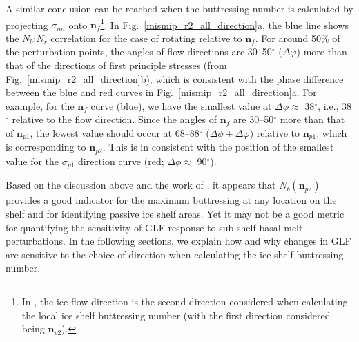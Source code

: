 \documentclass[tc, manuscript]{copernicus}
\begin{document}

A similar conclusion can be reached when the buttressing number is calculated by projecting $\sigma_{nn}$ onto $\mathbf{n}_{f}$\footnote{In \citet{furst2016}, the ice flow direction is the second direction considered when calculating the local ice shelf buttressing number (with the first direction considered being $\mathbf{n}_{p2}$).}. In Fig.~\ref{mismip_r2_all_direction}a, the blue line shows the $N_b$:$N_r$ correlation for the case of rotating relative to $\mathbf{n}_{f}$. %
For around 50\% of the perturbation points, the angles of flow directions are 30--50$^\circ$ ($\Delta\varphi$) more than that of the directions of first principle stresses (from Fig.~\ref{mismip_r2_all_direction}b), which is consistent with the phase difference between the blue and red curves in Fig.~\ref{mismip_r2_all_direction}a. For example, for the $\mathbf{n}_{f}$ curve (blue), we have the smallest value at $\Delta\phi\approx$ 38$^\circ$, i.e., 38$^\circ$ relative to the flow direction. Since the angles of $\mathbf{n}_{f}$ are 30--50$^\circ$ more than that of $\mathbf{n}_{p1}$, the lowest value should occur at 68--88$^\circ$ ($\Delta\phi+\Delta\varphi$) relative to $\mathbf{n}_{p1}$, which is corresponding to $\mathbf{n}_{p2}$. This is in consistent with the position of the smallest value for the $\sigma_{p1}$ direction curve (red; $\Delta\phi\approx$ 90$^\circ$). %


Based on the discussion above and the work of \citet{furst2016}, it appears that $N_b(\mathbf{n}_{p2})$ provides a good indicator for the maximum buttressing at any location on the shelf and for identifying passive ice shelf areas. Yet it may not be a good metric for quantifying the sensitivity of GLF response to sub-shelf basal melt perturbations. In the following sections, we explain how and why changes in GLF are sensitive to the choice of direction when calculating the ice shelf buttressing number. 
\end{document}
